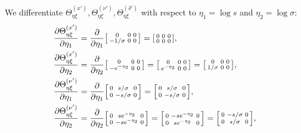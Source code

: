 \documentclass{article}
\begin{document}
We differentiate $\Theta_{\eta\xi}^{(x')}, \Theta_{\eta\xi}^{(\nu')}, \Theta_{\eta\xi}^{(\delta')}$ with respect to $\eta_1 = \log s$ and $\eta_2 = \log \sigma$:
%
\begin{align}
  \frac{\partial \Theta_{\eta\xi}^{(x')}}{\partial \eta_1}      & = \frac{\partial}{\partial \eta_1} \begin{bsmallmatrix} 0 & 0 & 0 \\ -1/\sigma & 0 & 0 \end{bsmallmatrix} = \begin{bsmallmatrix} 0 & 0 & 0 \\ 0 & 0 & 0 \end{bsmallmatrix},                                   \\
  \frac{\partial \Theta_{\eta\xi}^{(x')}}{\partial \eta_2}      & = \frac{\partial}{\partial \eta_2} \begin{bsmallmatrix} 0 & 0 & 0 \\ -e^{-\eta_2} & 0 & 0 \end{bsmallmatrix} = \begin{bsmallmatrix} 0 & 0 & 0 \\ e^{-\eta_2} & 0 & 0 \end{bsmallmatrix} = \begin{bsmallmatrix} 0 & 0 & 0 \\ 1/\sigma & 0 & 0 \end{bsmallmatrix}, \\
  \frac{\partial \Theta_{\eta\xi}^{(\nu')}}{\partial \eta_1}    & = \frac{\partial}{\partial \eta_1} \begin{bsmallmatrix} 0 & s/\sigma & 0 \\ 0 & -s/\sigma & 0 \end{bsmallmatrix} = \begin{bsmallmatrix} 0 & s/\sigma & 0 \\ 0 & -s/\sigma & 0 \end{bsmallmatrix},                                   \\
  \frac{\partial \Theta_{\eta\xi}^{(\nu')}}{\partial \eta_2}    & = \frac{\partial}{\partial \eta_2} \begin{bsmallmatrix} 0 & s e^{-\eta_2} & 0 \\ 0 & -s e^{-\eta_2} & 0 \end{bsmallmatrix} = \begin{bsmallmatrix} 0 & -s e^{-\eta_2} & 0 \\ 0 & s e^{-\eta_2} & 0 \end{bsmallmatrix} = \begin{bsmallmatrix} 0 & -s/\sigma & 0 \\ 0 & s/\sigma & 0 \end{bsmallmatrix}, \\

\end{align}
\end{document}
